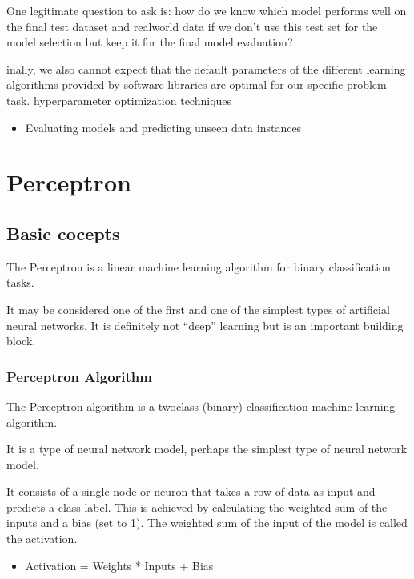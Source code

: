 \documentclass[letterpaper,10pt,english]{sphinxmanual}
\let\sphinxpxdimen\pdfpxdimen\else\newdimen\sphinxpxdimen
\begin{document}
\sphinxAtStartPar
One legitimate question to ask is: how do we know which model performs well on the final test data\sphinxhyphen{}set and real\sphinxhyphen{}world data if we don’t use this test set for the model selection but keep it for the final model evaluation?

\sphinxAtStartPar
inally, we also cannot expect that the default parameters of the different learning algorithms provided by software libraries are
optimal for our specific problem task.  hyperparameter optimization techniques
\begin{itemize}
\item {} 
\sphinxAtStartPar
Evaluating models and predicting unseen data instances

\end{itemize}

\sphinxstepscope


\chapter{Perceptron}
\label{\detokenize{percept/percept:perceptron}}\label{\detokenize{percept/percept::doc}}
\sphinxstepscope


\section{Basic cocepts}
\label{\detokenize{percept/basics:basic-cocepts}}\label{\detokenize{percept/basics::doc}}
\sphinxAtStartPar
The Perceptron is a linear machine learning algorithm for binary classification tasks.

\sphinxAtStartPar
It may be considered one of the first and one of the simplest types of artificial neural networks. It is definitely not “deep” learning but is an important building block.

\noindent\sphinxincludegraphics[width=500\sphinxpxdimen]{{biological-neuron}.jpg}


\subsection{Perceptron Algorithm}
\label{\detokenize{percept/basics:perceptron-algorithm}}
\sphinxAtStartPar
The Perceptron algorithm is a two\sphinxhyphen{}class (binary) classification machine learning algorithm.

\sphinxAtStartPar
It is a type of neural network model, perhaps the simplest type of neural network model.

\sphinxAtStartPar
It consists of a single node or neuron that takes a row of data as input and predicts a class label.
This is achieved by calculating the weighted sum of the inputs and a bias (set to 1).
The weighted sum of the input of the model is called the activation.
\begin{itemize}
\item {} 
\sphinxAtStartPar
Activation = Weights * Inputs + Bias

\end{itemize}
\end{document}

